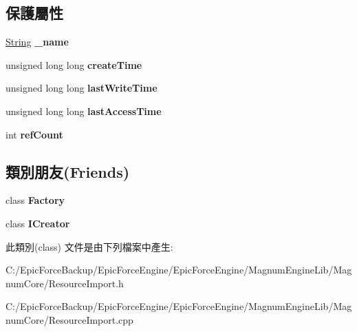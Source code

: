 \subsection*{保護屬性}
\begin{DoxyCompactItemize}
\item 
\hyperlink{class_magnum_1_1_string}{String} {\bfseries \+\_\+name}\hypertarget{class_magnum_1_1_resource_import_a2a924fced3a82c5f074d020509d4f735}{}\label{class_magnum_1_1_resource_import_a2a924fced3a82c5f074d020509d4f735}

\item 
unsigned long long {\bfseries create\+Time}\hypertarget{class_magnum_1_1_resource_import_abc38864211665497fb8386ef5802dccc}{}\label{class_magnum_1_1_resource_import_abc38864211665497fb8386ef5802dccc}

\item 
unsigned long long {\bfseries last\+Write\+Time}\hypertarget{class_magnum_1_1_resource_import_a3f791b5329a52f7d4663464ed1aa325e}{}\label{class_magnum_1_1_resource_import_a3f791b5329a52f7d4663464ed1aa325e}

\item 
unsigned long long {\bfseries last\+Access\+Time}\hypertarget{class_magnum_1_1_resource_import_a142cbd2acde541ec889cdb1ff8f7ccd7}{}\label{class_magnum_1_1_resource_import_a142cbd2acde541ec889cdb1ff8f7ccd7}

\item 
int {\bfseries ref\+Count}\hypertarget{class_magnum_1_1_resource_import_a62a5c0683fc03db58173a249a8dca203}{}\label{class_magnum_1_1_resource_import_a62a5c0683fc03db58173a249a8dca203}

\end{DoxyCompactItemize}
\subsection*{類別朋友(Friends)}
\begin{DoxyCompactItemize}
\item 
class {\bfseries Factory}\hypertarget{class_magnum_1_1_resource_import_a328c093d609680cca505905c6d49901a}{}\label{class_magnum_1_1_resource_import_a328c093d609680cca505905c6d49901a}

\item 
class {\bfseries I\+Creator}\hypertarget{class_magnum_1_1_resource_import_a6d6e56ac47edfce9d2590e0757222ded}{}\label{class_magnum_1_1_resource_import_a6d6e56ac47edfce9d2590e0757222ded}

\end{DoxyCompactItemize}


此類別(class) 文件是由下列檔案中產生\+:\begin{DoxyCompactItemize}
\item 
C\+:/\+Epic\+Force\+Backup/\+Epic\+Force\+Engine/\+Epic\+Force\+Engine/\+Magnum\+Engine\+Lib/\+Magnum\+Core/Resource\+Import.\+h\item 
C\+:/\+Epic\+Force\+Backup/\+Epic\+Force\+Engine/\+Epic\+Force\+Engine/\+Magnum\+Engine\+Lib/\+Magnum\+Core/Resource\+Import.\+cpp\end{DoxyCompactItemize}
